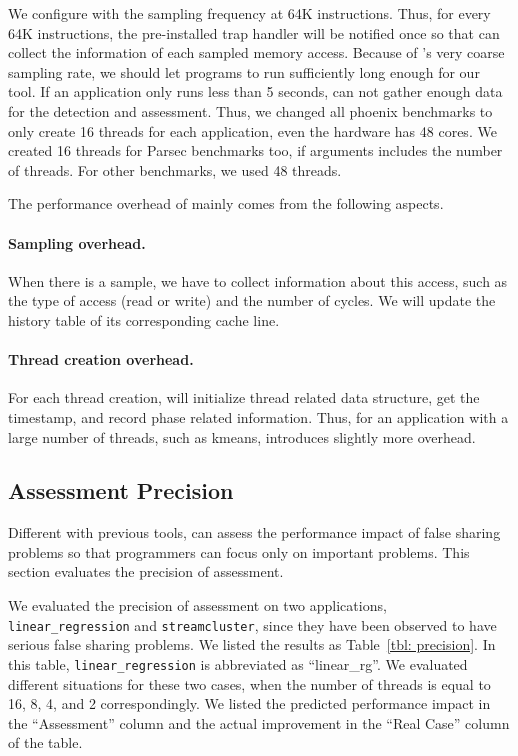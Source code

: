 We configure \cheetah{} with the sampling frequency at 64K instructions. Thus, for every 64K instructions, the pre-installed trap handler will be notified once so that \cheetah{} can collect the information of each sampled memory access. Because of \cheetah{}'s very coarse sampling rate, we should  let programs to run sufficiently long enough for our tool. If an application only runs less than 5 seconds, \cheetah{} can not gather enough data for the detection and assessment. Thus, we changed all phoenix benchmarks to only create 16 threads for each application, even the hardware has 48 cores.  We created 16 threads for Parsec benchmarks too, if arguments includes the number of threads. For other benchmarks, we used 48 threads. 

The performance overhead of \cheetah{} mainly comes from the following aspects. 
\paragraph{Sampling overhead.} When there is a sample, we have to collect information about this access, such as the type of access (read or write) and the number of cycles. We will update the history table of its corresponding cache line.

\paragraph{Thread creation overhead.} For each thread creation, \cheetah{} will initialize thread related data structure, get the timestamp, and record phase related information. Thus, for an application with a large number of threads, such as kmeans, \cheetah{} introduces slightly more overhead. 


\subsection{Assessment Precision}
\label{sec:precision}

Different with previous tools, \cheetah{} can assess the performance impact of false sharing problems so that programmers can focus only on important problems. This section evaluates the precision of assessment. 

We evaluated the precision of assessment on two applications, \texttt{linear\_regression} and \texttt{streamcluster}, since they have been observed to have serious false sharing problems. We listed the results as Table~\ref{tbl: precision}. In this table, \texttt{linear\_regression} is abbreviated as ``linear\_rg''.  We evaluated different situations for these two cases, when the number of threads is equal to 16, 8, 4, and 2 correspondingly. We listed the predicted performance impact in the ``Assessment'' column and the actual improvement in the ``Real Case'' column of the table. 

